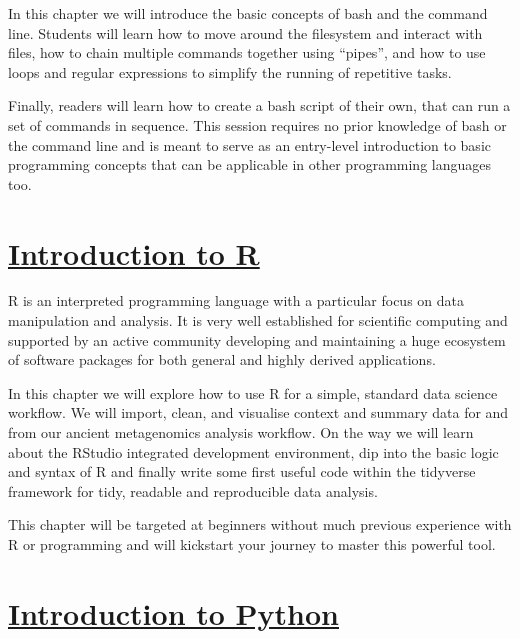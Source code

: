 \documentclass[
  letterpaper,
]{book}
\begin{document}
In this chapter we will introduce the basic concepts of bash and the
command line. Students will learn how to move around the filesystem and
interact with files, how to chain multiple commands together using
``pipes'', and how to use loops and regular expressions to simplify the
running of repetitive tasks.

Finally, readers will learn how to create a bash script of their own,
that can run a set of commands in sequence. This session requires no
prior knowledge of bash or the command line and is meant to serve as an
entry-level introduction to basic programming concepts that can be
applicable in other programming languages too.

\hypertarget{introduction-to-r}{%
\section*{\texorpdfstring{\protect\hyperlink{introduction-to-r-and-the-tidyverse}{Introduction
to R}}{Introduction to R}}\label{introduction-to-r}}


R is an interpreted programming language with a particular focus on data
manipulation and analysis. It is very well established for scientific
computing and supported by an active community developing and
maintaining a huge ecosystem of software packages for both general and
highly derived applications.

In this chapter we will explore how to use R for a simple, standard data
science workflow. We will import, clean, and visualise context and
summary data for and from our ancient metagenomics analysis workflow. On
the way we will learn about the RStudio integrated development
environment, dip into the basic logic and syntax of R and finally write
some first useful code within the tidyverse framework for tidy, readable
and reproducible data analysis.

This chapter will be targeted at beginners without much previous
experience with R or programming and will kickstart your journey to
master this powerful tool.

\hypertarget{introduction-to-python}{%
\section*{\texorpdfstring{\protect\hyperlink{introduction-to-python-and-pandas}{Introduction
to Python}}{Introduction to Python}}\label{introduction-to-python}}
\end{document}
